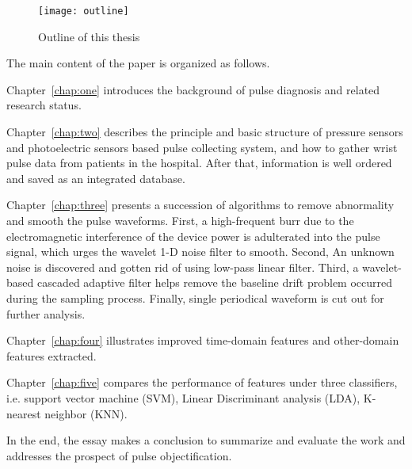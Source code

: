 \begin{figure}[htpb]
    \begin{center}
        \texttt{[image: outline]}
    \end{center}
    \caption{Outline of this thesis}
    \label{fig:outline}
\end{figure}

The main content of the paper is organized as follows. 

Chapter~\ref{chap:one} introduces the background of pulse diagnosis
and related research status.

Chapter~\ref{chap:two} describes the principle and basic structure of pressure sensors and
photoelectric sensors based pulse collecting system, and
how to gather wrist pulse data from patients in the hospital. After
that, information is well ordered and saved as an integrated database. 

Chapter~\ref{chap:three} presents a succession of algorithms to 
remove abnormality and smooth the pulse waveforms. First, a
high-frequent burr due to the electromagnetic interference of the
device power is adulterated into the pulse signal, which urges the wavelet
1-D noise filter to smooth. Second, An unknown noise is discovered and
gotten rid of using low-pass linear filter. Third, a wavelet-based
cascaded adaptive filter helps remove the baseline drift problem
occurred during the sampling process. Finally, single periodical
waveform is cut out for further analysis. 

Chapter~\ref{chap:four} illustrates improved time-domain features and
other-domain features extracted. \todo{}

Chapter~\ref{chap:five} compares the performance of features under
three classifiers, i.e. support vector machine (SVM), Linear
Discriminant analysis (LDA), K-nearest neighbor (KNN). \todo{}

In the end, the essay makes a conclusion to summarize and evaluate the
work and addresses the prospect of pulse objectification. 


